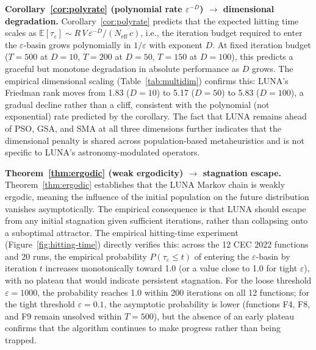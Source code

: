 \documentclass[review]{elsarticle}
\theoremstyle{definition}
\begin{document}
\textbf{Corollary~\ref{cor:polyrate} (polynomial rate $\varepsilon^{-D}$) $\to$ dimensional degradation.} Corollary~\ref{cor:polyrate} predicts that the expected hitting time scales as $\mathbb{E}[\tau_\varepsilon] \sim R\,V\,\varepsilon^{-D} / (N_{\mathrm{eff}}\,c)$, i.e., the iteration budget required to enter the $\varepsilon$-basin grows polynomially in $1/\varepsilon$ with exponent $D$. At fixed iteration budget ($T=500$ at $D=10$, $T=200$ at $D=50$, $T=150$ at $D=100$), this predicts a graceful but monotone degradation in absolute performance as $D$ grows. The empirical dimensional scaling (Table~\ref{tab:multidim}) confirms this: LUNA's Friedman rank moves from 1.83 ($D=10$) to 5.17 ($D=50$) to 5.83 ($D=100$), a gradual decline rather than a cliff, consistent with the polynomial (not exponential) rate predicted by the corollary. The fact that LUNA remains ahead of PSO, GSA, and SMA at all three dimensions further indicates that the dimensional penalty is shared across population-based metaheuristics and is not specific to LUNA's astronomy-modulated operators.

\textbf{Theorem~\ref{thm:ergodic} (weak ergodicity) $\to$ stagnation escape.} Theorem~\ref{thm:ergodic} establishes that the LUNA Markov chain is weakly ergodic, meaning the influence of the initial population on the future distribution vanishes asymptotically. The empirical consequence is that LUNA should escape from any initial stagnation given sufficient iterations, rather than collapsing onto a suboptimal attractor. The empirical hitting-time experiment (Figure~\ref{fig:hitting-time}) directly verifies this: across the 12 CEC 2022 functions and 20 runs, the empirical probability $P(\tau_\varepsilon \leq t)$ of entering the $\varepsilon$-basin by iteration $t$ increases monotonically toward 1.0 (or a value close to 1.0 for tight $\varepsilon$), with no plateau that would indicate persistent stagnation. For the loose threshold $\varepsilon = 1000$, the probability reaches 1.0 within 200 iterations on all 12 functions; for the tight threshold $\varepsilon = 0.1$, the asymptotic probability is lower (functions F4, F8, and F9 remain unsolved within $T=500$), but the absence of an early plateau confirms that the algorithm continues to make progress rather than being trapped.
\end{document}
